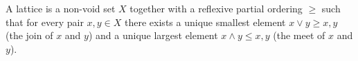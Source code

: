 A lattice is a non-void set $X$ together with a reflexive partial ordering $\geq$ such that for every pair $x, y \in X$ there exists a unique smallest element $x \vee y \geq x, y$ (the join of $x$ and $y$) and a unique largest element $x \wedge y \leq x, y$ (the meet of $x$ and $y$).
